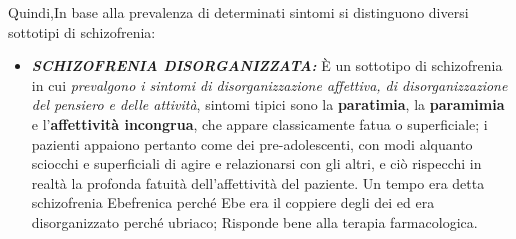 \documentclass[]{article}
\begin{document}
Quindi,In base alla prevalenza di determinati sintomi si distinguono
diversi sottotipi di schizofrenia:

\begin{itemize}
\item
  \textbf{\emph{SCHIZOFRENIA DISORGANIZZATA:}} È un sottotipo di
  schizofrenia in cui \emph{prevalgono i sintomi di disorganizzazione
  affettiva, di disorganizzazione del pensiero e delle attività},
  sintomi tipici sono la \textbf{paratimia}, la \textbf{paramimia} e
  l'\textbf{affettività incongrua}, che appare classicamente fatua o
  superficiale; i pazienti appaiono pertanto come dei pre-adolescenti,
  con modi alquanto sciocchi e superficiali di agire e relazionarsi con
  gli altri, e ciò rispecchi in realtà la profonda fatuità
  dell'affettività del paziente. Un tempo era detta schizofrenia
  Ebefrenica perché Ebe era il coppiere degli dei ed era disorganizzato
  perché ubriaco; Risponde bene alla terapia farmacologica.
\end{itemize}
\end{document}
